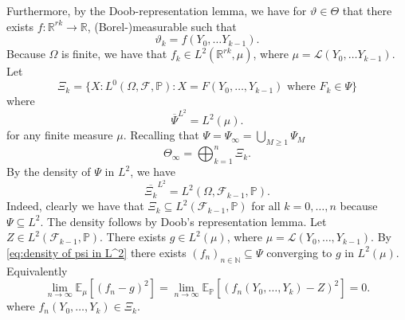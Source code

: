 \documentclass[11pt,a4paper,twoside,openany]{report}
\numberwithin{equation}{section}
\theoremstyle{plain} %
\theoremstyle{definition} %
\theoremstyle{remark} %
\begin{document}
    Furthermore, by the Doob-representation lemma, we have for \(\vartheta\in\Theta\) that there exists \(f:\mathbb{R}^{rk}\to\mathbb{R}\),  (Borel-)measurable such that
    \begin{equation*}
        \vartheta_k=f(Y_0,\dots Y_{k-1}).
    \end{equation*}
    Because \(\Omega\) is finite, we have that \(f_k\in L^2(\mathbb{R}^{rk},\mu)\), where \(\mu=\mathcal{L}(Y_0,\dots Y_{k-1})\).
    Let
    \begin{equation*}
        \Xi_k=\{X: L^0(\Omega,\mathcal{F},\mathbb{P}):X=F(Y_0,\dots,Y_{k-1})\text{ where } F_k\in\Psi\}
    \end{equation*}
    where 
    \begin{equation}\label{eq:density of psi in L^2}
        \overline{\Psi}^{L^2}=L^2(\mu).
    \end{equation}
    for any finite measure \(\mu\).
    Recalling that \(\Psi=\Psi_{\infty}=\bigcup_{M\geq 1}\Psi_M\)
    \begin{equation*}
        \Theta_{\infty}=\bigoplus_{k=1}^{n}\Xi_k.
    \end{equation*}
    By the density of \(\Psi\) in \(L^2\), we have 
    \begin{equation*}
    \overline{\Xi_k}^{L^2}=L^2(\Omega,\mathcal{F}_{k-1},\mathbb{P}).
    \end{equation*}
    Indeed, clearly we have that \(\Xi_k\subseteq L^2(\mathcal{F}_{k-1},\mathbb{P})\) for all \(k=0,\dots,n\) because \(\Psi\subseteq L^2\). The density follows by Doob's representation lemma. Let \(Z\in L^2(\mathcal{F}_{k-1},\mathbb{P})\). There exists \(g\in L^2(\mu)\), where \(\mu=\mathcal{L}(Y_0,\dots,Y_{k-1})\). By \eqref{eq:density of psi in L^2} there exists \((f_n)_{n\in\mathbb{N}}\subseteq\Psi\) converging to \(g\) in \(L^2(\mu)\). Equivalently
    \begin{equation*}
        \lim_{n\to\infty}\mathbb{E}_{\mu}[(f_n-g)^2]=\lim_{n\to\infty}\mathbb{E}_{\mathbb{P}}[(f_n(Y_0,\dots,Y_k)-Z)^2]=0.
    \end{equation*}
    where \(f_n(Y_0,\dots,Y_k)\in\Xi_k\).
\end{document}
